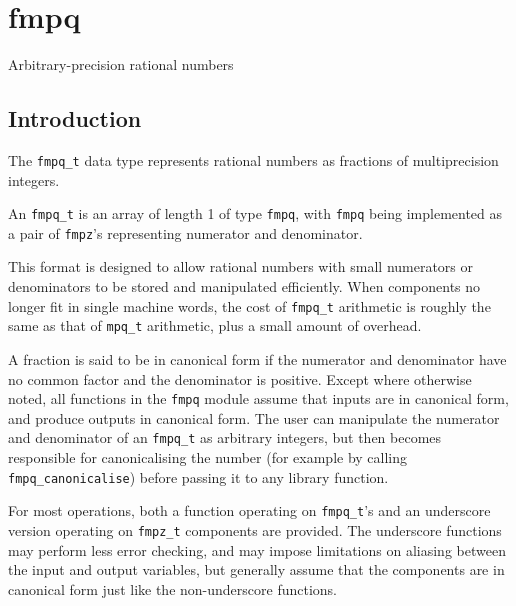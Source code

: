 \documentclass[a4paper,10pt]{book}
\newcommand{\code}{\lstinline}
\begin{document}
{{


\chapter{fmpq}
\epigraph{Arbitrary-precision rational numbers}{}

\section{Introduction}

The \code{fmpq_t} data type represents rational numbers
as fractions of multiprecision integers.

An \code{fmpq_t} is an array of length 1 of type \code{fmpq},
with \code{fmpq} being implemented as a pair of \code{fmpz}'s
representing numerator and denominator.

This format is designed to allow rational numbers with small
numerators or denominators to be stored and manipulated
efficiently. When components no longer fit in single
machine words, the cost of \code{fmpq_t} arithmetic
is roughly the same as that of \code{mpq_t} arithmetic,
plus a small amount of overhead.

A fraction is said to be in canonical form if the numerator
and denominator have no common factor and the denominator is
positive. Except where otherwise noted, all functions in the
\code{fmpq} module assume that
inputs are in canonical form, and produce outputs in canonical form.
The user can manipulate the numerator and denominator of an
\code{fmpq_t} as arbitrary integers, but then becomes
responsible for canonicalising the number (for example by calling
\code{fmpq_canonicalise}) before passing it to any library function.

For most operations, both a function operating
on \code{fmpq_t}'s and an underscore version operating
on \code{fmpz_t} components are provided. The underscore
functions may perform less error checking,
and may impose limitations on aliasing between the
input and output variables, but
generally assume that the components are in
canonical form just like the non-underscore functions.



}}
\end{document}
